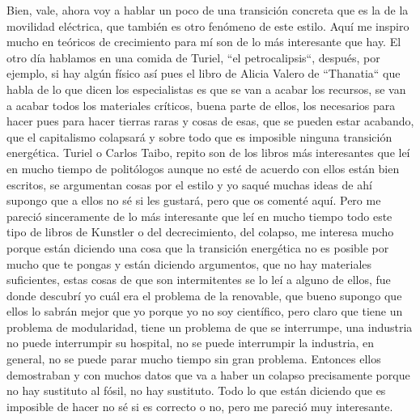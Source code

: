 Bien, vale, ahora voy a hablar un poco de una transición concreta que es la de la movilidad eléctrica, que también es otro fenómeno de este estilo. Aquí me inspiro mucho en teóricos de crecimiento para mí son de lo más interesante que hay.  El otro día hablamos en una comida de Turiel, ``el petrocalipsis``, después, por ejemplo, si hay algún físico así pues el libro de Alicia Valero de ``Thanatia`` que habla de lo que dicen los especialistas es que se van a acabar los recursos, se van a acabar todos los materiales críticos, buena parte de ellos, los necesarios para hacer pues para hacer tierras raras y cosas de esas, que se pueden estar acabando, que el capitalismo colapsará y sobre todo que es imposible ninguna transición energética. Turiel o Carlos Taibo, repito son de los libros más interesantes que leí en mucho tiempo de politólogos aunque no esté de acuerdo con ellos están bien escritos, se argumentan cosas por el estilo y yo saqué muchas ideas de ahí supongo que a ellos no sé si les gustará, pero que os comenté aquí. Pero me pareció sinceramente de lo más interesante que leí en mucho tiempo todo este tipo de libros de Kunstler o del decrecimiento, del colapso, me interesa mucho porque están diciendo una cosa que la transición energética no es posible por mucho que te pongas y están diciendo argumentos, que no hay materiales suficientes, estas cosas de que son intermitentes se lo leí a alguno de ellos, fue donde descubrí yo cuál era el problema de la renovable, que bueno supongo que ellos lo sabrán mejor que yo porque yo no soy científico, pero claro que tiene un problema de modularidad, tiene un problema de que se interrumpe, una industria no puede interrumpir su hospital, no se puede interrumpir la industria, en general, no se puede parar mucho tiempo sin gran problema. Entonces ellos demostraban y con muchos datos que va a haber un colapso precisamente porque no hay sustituto al fósil, no hay sustituto. Todo lo que están diciendo que es imposible de hacer no sé si es correcto o no, pero me pareció muy interesante.


